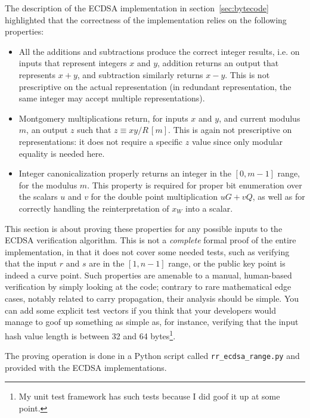 \documentclass{llncs}
\newcommand{\eqvm}[3]{#1 \equiv #2 \,[#3]}
\begin{document}
The description of the ECDSA implementation in
section~\ref{sec:bytecode} highlighted that the correctness of the
implementation relies on the following properties:
\begin{itemize}

    \item All the additions and subtractions produce the correct
    integer results, i.e. on inputs that represent integers $x$ and $y$,
    addition returns an output that represents $x + y$, and subtraction
    similarly returns $x - y$. This is not prescriptive on the actual
    representation (in redundant representation, the same integer may
    accept multiple representations).

    \item Montgomery multiplications return, for inputs $x$ and $y$, and
    current modulus $m$, an output $z$ such that $\eqvm{z}{xy/R}{m}$.
    This is again not prescriptive on representations: it does not
    require a specific $z$ value since only modular equality is needed
    here.

    \item Integer canonicalization properly returns an integer in
    the $[0, m-1]$ range, for the modulus $m$. This property is required
    for proper bit enumeration over the scalars $u$ and $v$ for the double
    point multiplication $uG + vQ$, as well as for correctly handling the
    reinterpretation of $x_W$ into a scalar.

\end{itemize}
This section is about proving these properties for any possible inputs
to the ECDSA verification algorithm. This is not a \emph{complete}
formal proof of the entire implementation, in that it does not cover
some needed tests, such as verifying that the input $r$ and $s$ are in
the $[1, n-1]$ range, or the public key point is indeed a curve point.
Such properties are amenable to a manual, human-based verification by
simply looking at the code; contrary to rare mathematical edge cases,
notably related to carry propagation, their analysis should be simple.
You can add some explicit test vectors if you think that your developers
would manage to goof up something as simple as, for instance, verifying
that the input hash value length is between 32 and 64 bytes\footnote{My
unit test framework has such tests because I did goof it up at some
point.}.

The proving operation is done in a Python script called
\verb+rr_ecdsa_range.py+ and provided with the ECDSA implementations.
\end{document}
